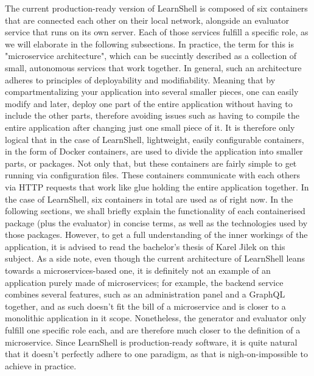 \documentclass[thesis=B,english]{FITthesis}[2019/12/23]
\begin{document}
The current production-ready version of LearnShell is composed of six containers that are connected each other on their local network, alongside an evaluator service that runs on its own server. Each of those services fulfill a specific role, as we will elaborate in the following subsections. In practice, the term for this is "microservice architecture", which can be succintly described as a collection of small, autonomous services that work together. \cite{building-microservices} 
\newline
In general, such an architecture adheres to principles of deployability and modifiability. \cite{building-microservices,architecting-chen} Meaning that by compartmentalizing your application into several smaller pieces, one can easily modify and later, deploy one part of the entire application without having to include the other parts, therefore avoiding issues such as having to compile the entire application after changing just one small piece of it. It is therefore only logical that in the case of LearnShell, lightweight, easily configurable containers, in the form of Docker containers, are used to divide the application into smaller parts, or packages. Not only that, but these containers are fairly simple to get running via configuration files. These containers communicate with each others via HTTP requests that work like glue holding the entire application together. \cite{microservices}
\newline
In the case of LearnShell, six containers in total are used as of right now. In the following sections, we shall briefly explain the functionality of each containerised package (plus the evaluator) in concise terms, as well as the technologies used by those packages. However, to get a full understanding of the inner workings of the application, it is advised to read the bachelor's thesis of Karel Jilek on this subject.
\newline
As a side note, even though the current architecture of LearnShell leans towards a microservices-based one, it is definitely not an example of an application purely made of microservices; for example, the backend service combines several features, such as an administration panel and a GraphQL together, and as such doesn't fit the bill of a microservice and is closer to a monolithic application in it scope. Nonetheless, the generator and evaluator only fulfill one specific role each, and are therefore much closer to the definition of a microservice. Since LearnShell is production-ready software, it is quite natural that it doesn't perfectly adhere to one paradigm, as that is nigh-on-impossible to achieve in practice.
\end{document}
